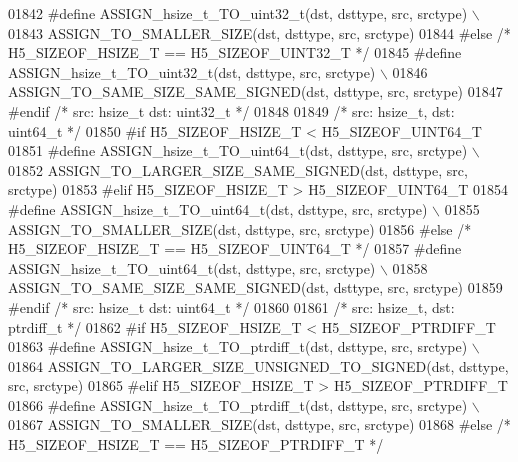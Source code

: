 \begin{DoxyCode}
01842 \textcolor{preprocessor}{    #define ASSIGN\_hsize\_t\_TO\_uint32\_t(dst, dsttype, src, srctype) \(\backslash\)}
01843 \textcolor{preprocessor}{        ASSIGN\_TO\_SMALLER\_SIZE(dst, dsttype, src, srctype)}
01844 \textcolor{preprocessor}{#else }\textcolor{comment}{/* H5\_SIZEOF\_HSIZE\_T == H5\_SIZEOF\_UINT32\_T */}\textcolor{preprocessor}{}
01845 \textcolor{preprocessor}{    #define ASSIGN\_hsize\_t\_TO\_uint32\_t(dst, dsttype, src, srctype) \(\backslash\)}
01846 \textcolor{preprocessor}{        ASSIGN\_TO\_SAME\_SIZE\_SAME\_SIGNED(dst, dsttype, src, srctype)}
01847 \textcolor{preprocessor}{#endif }\textcolor{comment}{/* src: hsize\_t dst: uint32\_t */}\textcolor{preprocessor}{}
01848 
01849 \textcolor{comment}{/* src: hsize\_t, dst: uint64\_t */}
01850 \textcolor{preprocessor}{#if H5\_SIZEOF\_HSIZE\_T < H5\_SIZEOF\_UINT64\_T}
01851 \textcolor{preprocessor}{    #define ASSIGN\_hsize\_t\_TO\_uint64\_t(dst, dsttype, src, srctype) \(\backslash\)}
01852 \textcolor{preprocessor}{        ASSIGN\_TO\_LARGER\_SIZE\_SAME\_SIGNED(dst, dsttype, src, srctype)}
01853 \textcolor{preprocessor}{#elif H5\_SIZEOF\_HSIZE\_T > H5\_SIZEOF\_UINT64\_T}
01854 \textcolor{preprocessor}{    #define ASSIGN\_hsize\_t\_TO\_uint64\_t(dst, dsttype, src, srctype) \(\backslash\)}
01855 \textcolor{preprocessor}{        ASSIGN\_TO\_SMALLER\_SIZE(dst, dsttype, src, srctype)}
01856 \textcolor{preprocessor}{#else }\textcolor{comment}{/* H5\_SIZEOF\_HSIZE\_T == H5\_SIZEOF\_UINT64\_T */}\textcolor{preprocessor}{}
01857 \textcolor{preprocessor}{    #define ASSIGN\_hsize\_t\_TO\_uint64\_t(dst, dsttype, src, srctype) \(\backslash\)}
01858 \textcolor{preprocessor}{        ASSIGN\_TO\_SAME\_SIZE\_SAME\_SIGNED(dst, dsttype, src, srctype)}
01859 \textcolor{preprocessor}{#endif }\textcolor{comment}{/* src: hsize\_t dst: uint64\_t */}\textcolor{preprocessor}{}
01860 
01861 \textcolor{comment}{/* src: hsize\_t, dst: ptrdiff\_t */}
01862 \textcolor{preprocessor}{#if H5\_SIZEOF\_HSIZE\_T < H5\_SIZEOF\_PTRDIFF\_T}
01863 \textcolor{preprocessor}{    #define ASSIGN\_hsize\_t\_TO\_ptrdiff\_t(dst, dsttype, src, srctype) \(\backslash\)}
01864 \textcolor{preprocessor}{        ASSIGN\_TO\_LARGER\_SIZE\_UNSIGNED\_TO\_SIGNED(dst, dsttype, src, srctype)}
01865 \textcolor{preprocessor}{#elif H5\_SIZEOF\_HSIZE\_T > H5\_SIZEOF\_PTRDIFF\_T}
01866 \textcolor{preprocessor}{    #define ASSIGN\_hsize\_t\_TO\_ptrdiff\_t(dst, dsttype, src, srctype) \(\backslash\)}
01867 \textcolor{preprocessor}{        ASSIGN\_TO\_SMALLER\_SIZE(dst, dsttype, src, srctype)}
01868 \textcolor{preprocessor}{#else }\textcolor{comment}{/* H5\_SIZEOF\_HSIZE\_T == H5\_SIZEOF\_PTRDIFF\_T */}\textcolor{preprocessor}{}

\end{DoxyCode}
